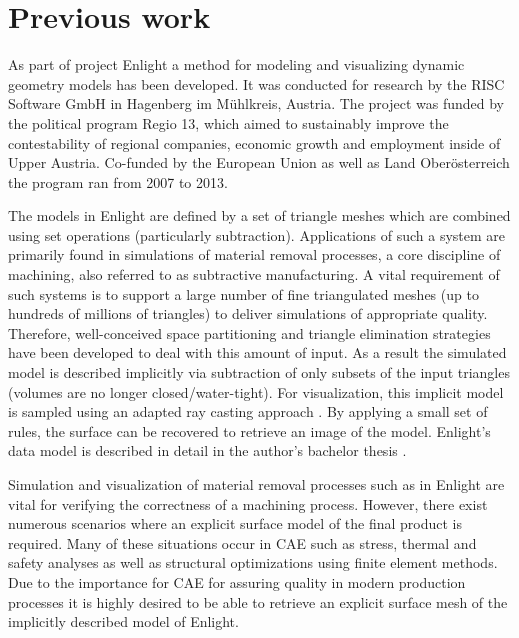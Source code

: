 
\section{Previous work}

As part of project Enlight a method for modeling and visualizing dynamic geometry models has been developed.
It was conducted for research by the RISC Software GmbH in Hagenberg im M\"uhlkreis, Austria. The project was funded by the political program Regio 13, which aimed to sustainably improve the contestability of regional companies, economic growth and employment inside of Upper Austria. Co-funded by the European Union as well as Land Ober\"osterreich the program ran from 2007 to 2013.

The models in Enlight are defined by a set of triangle meshes which are combined using set operations (particularly subtraction). Applications of such a system are primarily found in simulations of material removal processes, a core discipline of machining, also referred to as subtractive manufacturing. A vital requirement of such systems is to support a large number of fine triangulated meshes (up to hundreds of millions of triangles) to deliver simulations of appropriate quality. Therefore, well-conceived space partitioning and triangle elimination strategies have been developed to deal with this amount of input. As a result the simulated model is described implicitly via subtraction of only subsets of the input triangles (volumes are no longer closed/water-tight). For visualization, this implicit model is sampled using an adapted ray casting approach \cite{enlight}. By applying a small set of rules, the surface can be recovered to retrieve an image of the model. Enlight's data model is described in detail in the author's bachelor thesis \cite{bachelor}.

Simulation and visualization of material removal processes such as in Enlight are vital for verifying the correctness of a machining process. However, there exist numerous scenarios where an explicit surface model of the final product is required. Many of these situations occur in CAE such as stress, thermal and safety analyses as well as structural optimizations using finite element methods.
Due to the importance for CAE for assuring quality in modern production processes it is highly desired to be able to retrieve an explicit surface mesh of the implicitly described model of Enlight.